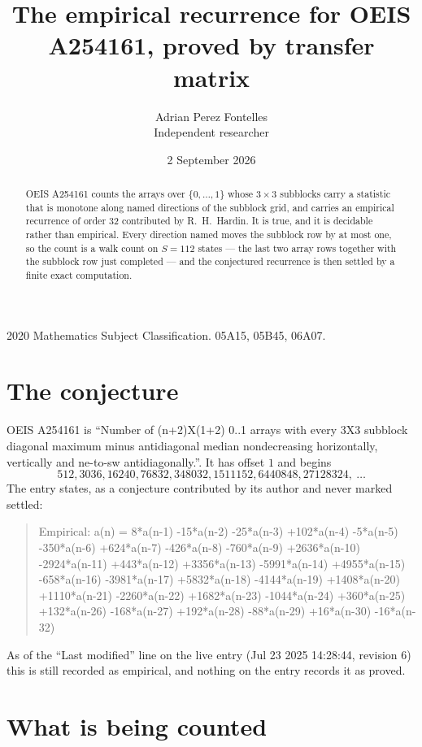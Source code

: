 \documentclass[11pt,a4paper]{article}
\title{The empirical recurrence for OEIS A254161, proved by transfer matrix}
\author{Adrian Perez Fontelles\\ \small Independent researcher}
\date{2 September 2026}
\theoremstyle{plain}
\theoremstyle{definition}
\begin{document}
\maketitle

\begin{abstract}
OEIS A254161 counts the arrays over $\{0,\dots,1\}$ whose $3\times3$ subblocks carry a
statistic that is monotone along named directions of the subblock grid, and carries an
empirical recurrence of order $32$ contributed by R.~H.~Hardin. It is true, and it is
decidable rather than empirical. Every direction named moves the subblock row by at most one,
so the count is a walk count on $S=112$ states --- the last two array rows together with the
subblock row just completed --- and the conjectured recurrence is then settled by a finite
exact computation.
\end{abstract}

\noindent\small 2020 Mathematics Subject Classification. 05A15, 05B45, 06A07.\normalsize

\section{The conjecture}

OEIS A254161 is ``Number of (n+2)X(1+2) 0..1 arrays with every 3X3 subblock diagonal maximum minus antidiagonal median nondecreasing horizontally, vertically and ne-to-sw antidiagonally.''. It has offset $1$ and begins
\[
512, 3036, 16240, 76832, 348032, 1511152, 6440848, 27128324,\ \dots
\]
The entry states, as a conjecture contributed by its author and never marked settled:
\begin{quote}
Empirical: a(n) = 8*a(n-1) -15*a(n-2) -25*a(n-3) +102*a(n-4) -5*a(n-5) -350*a(n-6) +624*a(n-7) -426*a(n-8) -760*a(n-9) +2636*a(n-10) -2924*a(n-11) +443*a(n-12) +3356*a(n-13) -5991*a(n-14) +4955*a(n-15) -658*a(n-16) -3981*a(n-17) +5832*a(n-18) -4144*a(n-19) +1408*a(n-20) +1110*a(n-21) -2260*a(n-22) +1682*a(n-23) -1044*a(n-24) +360*a(n-25) +132*a(n-26) -168*a(n-27) +192*a(n-28) -88*a(n-29) +16*a(n-30) -16*a(n-32)
\end{quote}
As of the ``Last modified'' line on the live entry (Jul 23 2025 14:28:44, revision 6) this is still
recorded as empirical, and nothing on the entry records it as proved.

\section{What is being counted}
\end{document}
